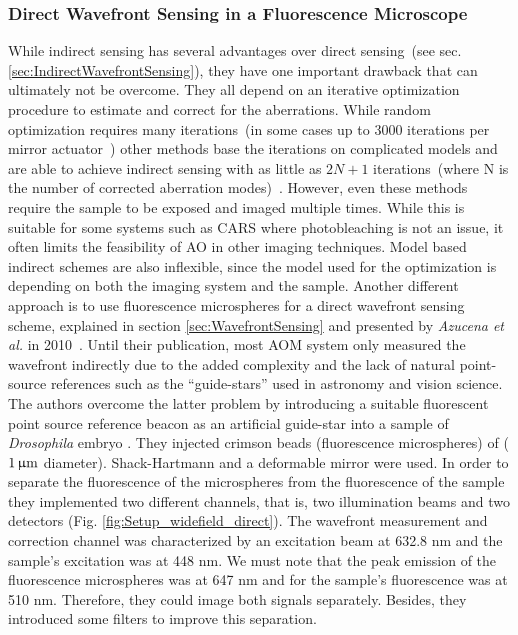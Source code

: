 \subsubsection{Direct Wavefront Sensing in a Fluorescence Microscope}
\label{sec:DirectFluorescenceMicroscope}

While indirect sensing has several advantages over direct sensing~(see sec. \ref{sec:IndirectWavefrontSensing}), they have one important drawback that can ultimately not be overcome. They all depend on an iterative optimization procedure to estimate and correct for the aberrations. While random optimization requires many iterations~(in some cases up to 3000 iterations per mirror actuator~\cite{scan_CARS}) other methods base the iterations on complicated models and are able to achieve indirect sensing with as little as $2N+1$ iterations~(where N is the number of corrected aberration modes)~\cite{wide_AOM_loew_freq,wide_AOM_structured_illu,scan_TPFM_image_based}. However, even these methods require the sample to be exposed and imaged multiple times. While this is suitable for some systems such as CARS where photobleaching is not an issue, it often limits the feasibility of AO in other imaging techniques. Model based indirect schemes are also inflexible, since the model used for the optimization is depending on both the imaging system and the sample. Another different approach is to use fluorescence microspheres for a direct wavefront sensing scheme, explained in section \ref{sec:WavefrontSensing} and presented by \emph{Azucena et al.} in 2010~\cite{wide_fluorescence_guide_star}. Until their publication, most AOM system only measured the wavefront indirectly due to the added complexity and the lack of natural point-source references such as the ``guide-stars'' used in astronomy and vision science. The authors overcome the latter problem by introducing a suitable fluorescent point source reference beacon as an artificial guide-star into a sample of \emph{Drosophila} embryo \cite{wide_directSensing_microscope}. They injected crimson beads (fluorescence microspheres) of ($\unit[1]{\upmu m}$ diameter). Shack-Hartmann and a deformable mirror were used. In order to separate the fluorescence of the microspheres from the fluorescence of the sample they implemented two different channels, that is, two illumination beams and two detectors (Fig. \ref{fig:Setup_widefield_direct}). The wavefront measurement and correction channel was characterized by an excitation beam at 632.8 nm and the sample's excitation was at 448 nm. We must note that the peak emission of the fluorescence microspheres was at 647 nm and for the sample's fluorescence was at 510 nm. Therefore, they could image both signals separately. Besides, they introduced some filters to improve this separation.

